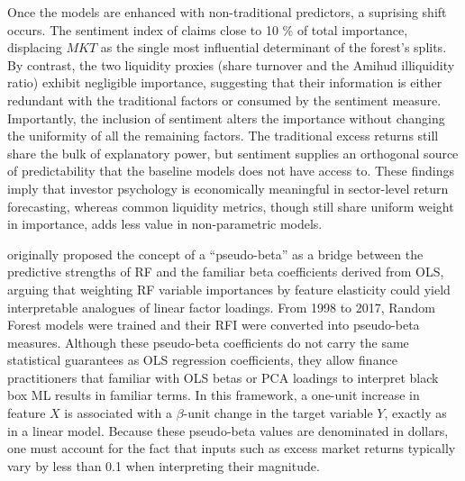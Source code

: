 Once the models are enhanced with non-traditional predictors, a suprising shift occurs. The sentiment index of  claims close to 10 \% of total importance, displacing $MKT$ as the single most influential determinant of the forest's splits. By contrast, the two liquidity proxies (share turnover and the Amihud illiquidity ratio) exhibit negligible importance, suggesting that their information is either redundant with the traditional factors or consumed by the sentiment measure. Importantly, the inclusion of sentiment alters the importance without changing the uniformity of all the remaining factors. The traditional excess returns still share the bulk of explanatory power, but sentiment supplies an orthogonal source of predictability that the baseline models does not have access to. These findings imply that investor psychology is economically meaningful in sector-level return forecasting, whereas common liquidity metrics, though still share uniform weight in importance, adds less value in non-parametric models.

 






 originally proposed the concept of a “pseudo-beta” as a bridge between the predictive strengths of RF and the familiar beta coefficients derived from OLS, arguing that weighting RF variable importances by feature elasticity could yield interpretable analogues of linear factor loadings. From 1998 to 2017, Random Forest models were trained and their RFI were converted into pseudo-beta measures. Although these pseudo-beta coefficients do not carry the same statistical guarantees as OLS regression coefficients, they allow finance practitioners that familiar with OLS betas or PCA loadings to interpret black box ML results in familiar terms. In this framework, a one-unit increase in feature $X$ is associated with a $\beta$-unit change in the target variable $Y$, exactly as in a linear model. Because these pseudo-beta values are denominated in dollars, one must account for the fact that inputs such as excess market returns typically vary by less than 0.1 when interpreting their magnitude.

